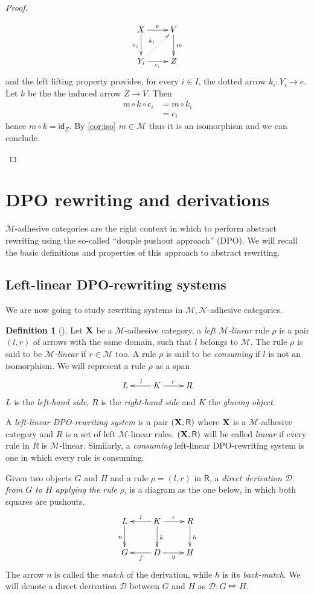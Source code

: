 \documentclass[a4paper]{article}
\newcommand{\id}[1]{\mathsf{id}_{#1}}
\def\R{\mathsf{R}}
\def\X{\textbf {\textup{X}}}
\newcommand{\dder}[1]{\mathscr{#1}}
\theoremstyle{definition}
\newtheorem{definition}[theorem]{Definition}
\begin{document}
\begin{proof}
\begin{enumerate}
		\[\xymatrix{X\ar[r]^{e} \ar[d]_{e_i} & V \ar[d]^{m} \\ Y_i \ar@{.>}^{k_i}[ur] \ar[r]_{c_i}  & Z}\]
		and the left lifting property provides, for every $i\in I$, the dotted arrow $k_i\colon Y_i\to e$. Let $k$ be the the induced arrow $Z\to V$. Then
		\begin{align*}
			m\circ k\circ c_i&=m\circ k_i\\&=c_i
		\end{align*}
		hence $m\circ k=\id{Z}$. By \cref{cor:iso} $m\in \mathcal{M}$ thus it is an isomorphism and we can conclude. \qedhere 
	\end{enumerate}
\end{proof}


\section{DPO rewriting and derivations}

$\mathcal{M}$-adhesive categories are the right context in which to perform abstract rewriting using the so-called ``douple pushout approach'' (DPO). We will recall the basic definitions and properties of this approach to abstract rewriting. 

\subsection{Left-linear DPO-rewriting systems}
We are now going to study rewriting systems in $\mathcal{M}, \mathcal{N}$-adhesive categories.

\begin{definition}[\cite{habel2012mathcal,heindel2009category}]
	Let $\X$ be a $\mathcal{M}$-adhesive category, a  \emph{left $\mathcal{M}$-linear} rule $\rho$ is a pair $(l,r)$ of arrows with the same domain, such that $l$ belongs to $\mathcal{M}$.  The rule $\rho$ is said to be \emph{$\mathcal{M}$-linear} if $r\in \mathcal{M}$ too. A rule $\rho$ is said to be \emph{consuming} if $l$ is not an isomorphism. We will represent a rule $\rho$ as a span 
	\[\xymatrix{L & K\ar[l]_{l} \ar[r]^{r} & R}\]
$L$ is the \emph{left-hand side}, $R$ is the \emph{right-hand side} and $K$ the \emph{glueing object}. 


A \emph{left-linear DPO-rewriting system} is a pair $(\X, \R)$ where $\X$ is a $\mathcal{M}$-adhesive category and $R$ is a set of left $\mathcal{M}$-linear rules. $(\X, \R)$ will be called \emph{linear} if every rule in $R$ is $\mathcal{M}$-linear. Similarly, a \emph{consuming} left-linear DPO-rewriting system is one in which every rule is consuming.

Given  two objects $G$ and $H$ and a rule $\rho=(l,r)$ in $\R$, a \emph{direct derivation $\mathscr{D}$ from $G$ to $H$ applying the rule $\rho$}, is a diagram as the one below, in which both squares are pushouts. 
	\[\xymatrix{L \ar[d]_{n}& K \ar[d]^{k}\ar[l]_{l} \ar[r]^{r} & R \ar[d]^{h}\\G & \ar[l]^{f} D \ar[r]_{g}& H}\]
	The arrow $n$ is called the \emph{match} of the derivation, while $h$ is its \emph{back-match}.
	We will denote a direct derivation $\dder{D}$ between $G$ and $H$ as $\dder{D}\colon G\Mapsto H$. 
\end{definition}
\end{document}

